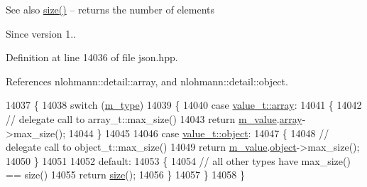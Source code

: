 \begin{DoxySeeAlso}{See also}
\hyperlink{classnlohmann_1_1basic__json_a25e27ad0c6d53c01871c5485e1f75b96}{size()} -- returns the number of elements
\end{DoxySeeAlso}
\begin{DoxySince}{Since}
version 1.. 
\end{DoxySince}


Definition at line 14036 of file json.\+hpp.



References nlohmann\+::detail\+::array, and nlohmann\+::detail\+::object.


\begin{DoxyCode}
14037     \{
14038         \textcolor{keywordflow}{switch} (\hyperlink{classnlohmann_1_1basic__json_a91990b60d7d4d67968a2c1db677536e7}{m\_type})
14039         \{
14040             \textcolor{keywordflow}{case} \hyperlink{namespacenlohmann_1_1detail_a1ed8fc6239da25abcaf681d30ace4985af1f713c9e000f5d3f280adbd124df4f5}{value\_t::array}:
14041             \{
14042                 \textcolor{comment}{// delegate call to array\_t::max\_size()}
14043                 \textcolor{keywordflow}{return} \hyperlink{classnlohmann_1_1basic__json_aeb0814f76966f99290cb29e127c90a77}{m\_value}.\hyperlink{unionnlohmann_1_1basic__json_1_1json__value_a7947687f3ae1911d6e9847e2b3226157}{array}->max\_size();
14044             \}
14045 
14046             \textcolor{keywordflow}{case} \hyperlink{namespacenlohmann_1_1detail_a1ed8fc6239da25abcaf681d30ace4985aa8cfde6331bd59eb2ac96f8911c4b666}{value\_t::object}:
14047             \{
14048                 \textcolor{comment}{// delegate call to object\_t::max\_size()}
14049                 \textcolor{keywordflow}{return} \hyperlink{classnlohmann_1_1basic__json_aeb0814f76966f99290cb29e127c90a77}{m\_value}.\hyperlink{unionnlohmann_1_1basic__json_1_1json__value_a4a2209bb26e7088cd36bf24824ab5521}{object}->max\_size();
14050             \}
14051 
14052             \textcolor{keywordflow}{default}:
14053             \{
14054                 \textcolor{comment}{// all other types have max\_size() == size()}
14055                 \textcolor{keywordflow}{return} \hyperlink{classnlohmann_1_1basic__json_a25e27ad0c6d53c01871c5485e1f75b96}{size}();
14056             \}
14057         \}
14058     \}
\end{DoxyCode}
\mbox{\label{classnlohmann_1_1basic__json_a0ec0cd19cce42ae6071f3cc6870ea295}} 
